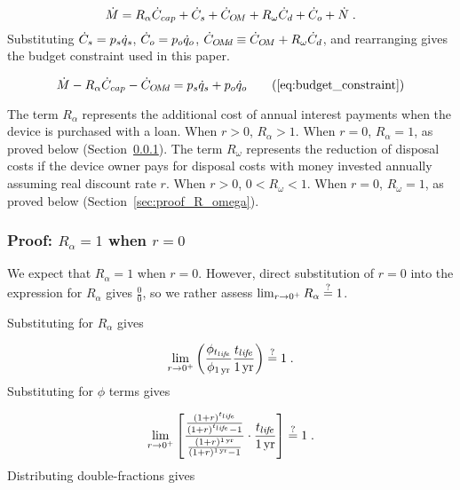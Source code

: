 \begin{equation}
  \dot{M} = R_\alpha \dot{C}_{cap} + 
             \dot{C}_s + 
             \dot{C}_{O\!M} + 
             R_\omega \dot{C}_d + 
             \dot{C}_o + 
             \dot{N} \; .
\end{equation}
%
Substituting $\dot{C}_s = p_s \dot{q}_s$,  
$\dot{C}_o = p_o \dot{q}_o$, $\dot{C}_{O\!M\!d} \equiv \dot{C}_{O\!M} + R_\omega \dot{C}_d$, and rearranging gives
the budget constraint used in this paper.

\begin{equation}
  \budgetconstraint \tag{\ref{eq:budget_constraint}}
\end{equation}

The term $R_\alpha$ represents the additional cost of annual interest
payments when the device is purchased with a loan.
When $r > 0$, $R_\alpha > 1$.
When $r = 0$, $R_\alpha = 1$, as proved below
(Section~\ref{sec:proof_R_alpha}).
The term $R_\omega$ represents the reduction of disposal costs 
if the device owner pays for disposal costs with money
invested annually assuming real discount rate $r$. 
When $r > 0$, $0 < R_\omega < 1$.
When $r = 0$, $R_\omega = 1$, as proved below
(Section~\ref{sec:proof_R_omega}).


\subsubsection{Proof: $R_\alpha = 1$ when $r = 0$}
\label{sec:proof_R_alpha}

We expect that $R_\alpha = 1$ when $r = 0$.
However, direct substitution of $r = 0$ into the expression
for $R_\alpha$ gives $\frac{0}{0}$, 
so we rather assess
$\lim_{r \to 0^+} R_\alpha \stackrel{?}{=} 1$.

Substituting for $R_\alpha$ gives

\begin{equation}
  \lim_{r \to 0^+} \left( \frac{\phi_{t_{li\!f\!e}}}{\phi_{1\,\mathrm{yr}}} \frac{t_{li\!f\!e}}{1\,\mathrm{yr}} \right) 
  \stackrel{?}{=} 1 \; .
\end{equation}
%
Substituting for $\phi$ terms gives

\begin{equation}
  \lim_{r \to 0^+} \left[ \frac{\frac{(1 + r)^{t_{li\!f\!e}}}{(1 + r)^{t_{li\!f\!e}} - 1}}{\frac{(1 + r)^{1\,\mathrm{yr}}}{(1 + r)^{1\,\mathrm{yr}} - 1}} \cdot \frac{t_{li\!f\!e}}{1\,\mathrm{yr}} \right] \stackrel{?}{=} 1 \; .
\end{equation}
%
Distributing double-fractions gives

